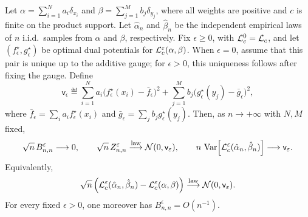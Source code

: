 \begin{prop}\label{prop-finite-ot-clt}
Let \(\alpha=\sum_{i=1}^{N}a_i\delta_{x_i}\) and \(\beta=\sum_{j=1}^{M}b_j\delta_{y_j}\), where all weights are positive and \(c\) is finite on the product support. Let \(\hat\alpha_n\) and \(\hat\beta_n\) be the independent empirical laws of \(n\) i.i.d.\ samples from \(\alpha\) and \(\beta\), respectively. Fix \(\epsilon\geq0\), with \(\mathcal{L}_c^0=\mathcal{L}_c\), and let \((f_\epsilon^\star,g_\epsilon^\star)\) be optimal dual potentials for \(\mathcal{L}_c^\varepsilon(\alpha,\beta)\). When \(\epsilon=0\), assume that this pair is unique up to the additive gauge; for \(\epsilon>0\), this uniqueness follows after fixing the gauge. Define
\[
\mathsf{v}_\epsilon
\eqdef
\sum_{i=1}^{N}a_i\bigl(f_\epsilon^\star(x_i)-\bar f_\epsilon\bigr)^2
+
\sum_{j=1}^{M}b_j\bigl(g_\epsilon^\star(y_j)-\bar g_\epsilon\bigr)^2,
\]
where \(\bar f_\epsilon=\sum_i a_i f_\epsilon^\star(x_i)\) and \(\bar g_\epsilon=\sum_j b_j g_\epsilon^\star(y_j)\). Then, as \(n\to+\infty\) with \(N,M\) fixed,
\[
\sqrt n\,B_{n,n}^\varepsilon\longrightarrow0,
\qquad
\sqrt n\,Z_{n,n}^\varepsilon\overset{\mathrm{law}}{\longrightarrow}\mathcal{N}(0,\mathsf{v}_\varepsilon),
\qquad
n\,\operatorname{Var}\!\left[\mathcal{L}_c^\varepsilon(\hat\alpha_n,\hat\beta_n)\right]
\longrightarrow\mathsf{v}_\varepsilon.
\]
Equivalently,
\[
\sqrt n\left(
\mathcal{L}_c^\varepsilon(\hat\alpha_n,\hat\beta_n)
-
\mathcal{L}_c^\varepsilon(\alpha,\beta)
\right)
\overset{\mathrm{law}}{\longrightarrow}\mathcal{N}(0,\mathsf{v}_\varepsilon).
\]
For every fixed \(\epsilon>0\), one moreover has \(B_{n,n}^\epsilon=O(n^{-1})\).
\end{prop}
